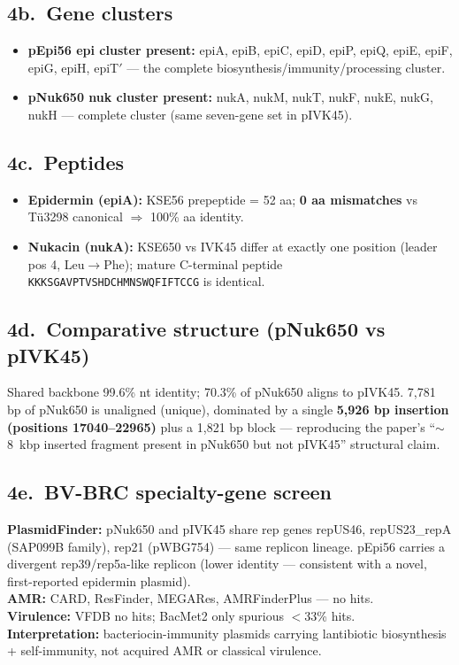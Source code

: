 \documentclass[11pt]{article}
\begin{document}
\subsection*{4b.\ Gene clusters}
\begin{itemize}
  \item \textbf{pEpi56 epi cluster present:} epiA, epiB, epiC, epiD, epiP,
        epiQ, epiE, epiF, epiG, epiH, epiT$'$ --- the complete
        biosynthesis/immunity/processing cluster.
  \item \textbf{pNuk650 nuk cluster present:} nukA, nukM, nukT, nukF, nukE,
        nukG, nukH --- complete cluster (same seven-gene set in pIVK45).
\end{itemize}

\subsection*{4c.\ Peptides}
\begin{itemize}
  \item \textbf{Epidermin (epiA):} KSE56 prepeptide = 52 aa;
        \textbf{0 aa mismatches} vs T\"u3298 canonical $\Rightarrow$ 100\%
        aa identity.
  \item \textbf{Nukacin (nukA):} KSE650 vs IVK45 differ at exactly one
        position (leader pos 4, Leu$\to$Phe); mature C-terminal peptide
        \texttt{KKKSGAVPTVSHDCHMNSWQFIFTCCG} is identical.
\end{itemize}

\subsection*{4d.\ Comparative structure (pNuk650 vs pIVK45)}
Shared backbone 99.6\% nt identity; 70.3\% of pNuk650 aligns to pIVK45.
7{,}781 bp of pNuk650 is unaligned (unique), dominated by a single
\textbf{5{,}926 bp insertion (positions 17040--22965)} plus a 1{,}821 bp
block --- reproducing the paper's ``\(\sim\)8~kbp inserted fragment present
in pNuk650 but not pIVK45'' structural claim.

\subsection*{4e.\ BV-BRC specialty-gene screen}
\textbf{PlasmidFinder:} pNuk650 and pIVK45 share rep genes repUS46,
repUS23\_repA (SAP099B family), rep21 (pWBG754) --- same replicon lineage.
pEpi56 carries a divergent rep39/rep5a-like replicon (lower identity ---
consistent with a novel, first-reported epidermin plasmid).\\
\textbf{AMR:} CARD, ResFinder, MEGARes, AMRFinderPlus --- no hits.\\
\textbf{Virulence:} VFDB no hits; BacMet2 only spurious \(<\)33\% hits.\\
\textbf{Interpretation:} bacteriocin-immunity plasmids carrying lantibiotic
biosynthesis + self-immunity, not acquired AMR or classical virulence.
\end{document}
